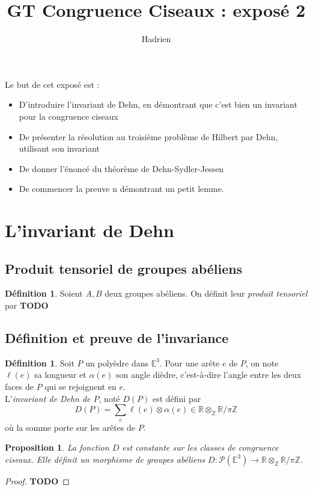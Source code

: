 \documentclass{article}
\title{GT Congruence Ciseaux : exposé 2}
\author{Hadrien}
\date{}
\newcommand{\Z}{\mathbb{Z}}
\newcommand{\R}{\mathbb{R}}
\newcommand{\E}{\mathbb{E}}
\renewcommand{\P}{\mathcal{P}}
\newcommand{\todo}{\textbf{TODO}}
\theoremstyle{plain}
\newtheorem{proposition}[theorem]{Proposition}
\theoremstyle{definition}
\newtheorem{definition}[theorem]{Définition}
\theoremstyle{remark}
\begin{document}
Le but de cet exposé est :
\begin{itemize}
    \item D'introduire l'invariant de Dehn, en démontrant que c'est bien un invariant pour la congruence ciseaux
    \item De présenter la résolution au troisième problème de Hilbert par Dehn, utilisant son invariant
    \item De donner l'énoncé du théorème de Dehn-Sydler-Jessen
    \item De commencer la preuve n démontrant un petit lemme.
\end{itemize}

\section{L'invariant de Dehn}

\subsection{Produit tensoriel de groupes abéliens}

\begin{definition}
    Soient $A,B$ deux groupes abéliens. On définit leur \emph{produit tensoriel} par \todo
\end{definition}

\subsection{Définition et preuve de l'invariance}

\begin{definition}
    Soit $P$ un polyèdre dans $\E^3$. Pour une arête $e$ de $P$, on note $\ell(e)$ sa longueur et $\alpha(e)$ son angle dièdre, c'est-à-dire l'angle entre les deux faces de $P$ qui se rejoignent en $e$. \\
    L'\emph{invariant de Dehn de $P$}, noté $D(P)$ est défini par
    \[D(P) = \sum_e \ell(e) \otimes \alpha(e) \in \R \otimes_\Z \R/\pi\Z\]
    où la somme porte sur les arêtes de $P$.
\end{definition}

\begin{proposition}
    La fonction $D$ est constante sur les classes de congruence ciseaux. Elle définit un morphisme de groupes abéliens $D : \P(\E^3) \to \R \otimes_\Z \R/\pi \Z$.
\end{proposition}

\begin{proof}
    \todo
\end{proof}
\end{document}
